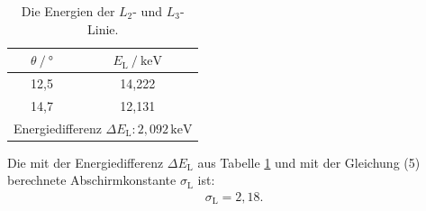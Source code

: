 \begin{table}[H]
  \centering
  \caption{Die Energien der $L_2$- und $L_3$-Linie.}
  \label{tab:hg}
\begin{tabular}{c c}
  \toprule
$\theta\:/\:°$ & $E_\text{L}\:/\: \si{\kilo\electronvolt}$ \\
\midrule
12,5 & 14,222 \\
14,7 & 12,131 \\
\midrule
\multicolumn{2}{c}{Energiedifferenz $\Delta E_\text{L}: 2,092\,\si{\kilo\electronvolt}$} \\
\bottomrule
\end{tabular}
\end{table}
\noindent Die mit der Energiedifferenz $\Delta E_\text{L}$ aus Tabelle \ref{tab:hg} und mit der Gleichung (5) berechnete Abschirmkonstante $\sigma_\text{L}$ ist:
\begin{align*}
\sigma_\text{L} = 2,18.
\end{align*}
